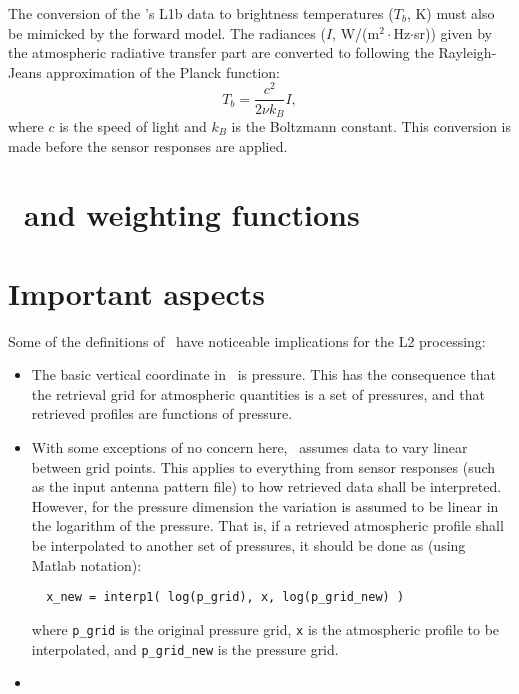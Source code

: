 The conversion of the \smr's L1b data to brightness temperatures ($T_b$, K)
must also be mimicked by the forward model. The radiances ($I$,
W/(m$^2\cdot$Hz$\cdot$sr)) given by the atmospheric radiative transfer part are
converted to following the Rayleigh-Jeans approximation of the Planck function:
\begin{equation}
  \label{eq:i2tb}
  T_b = \frac{c^2}{2\nu k_B} I,
\end{equation}
where $c$ is the speed of light and $k_B$ is the Boltzmann constant. This
conversion is made before the sensor responses are applied.



\section{\ARTS\ and weighting functions}
\label{sec:arts:wfuns}
%



\section{Important aspects}
\label{sec:arts:aspects}
%
Some of the definitions of \ARTS\ have noticeable implications for the
L2 processing:
\begin{itemize}
\item The basic vertical coordinate in \ARTS\ is pressure. This has the
  consequence that the retrieval grid for atmospheric quantities is a set of
  pressures, and that retrieved profiles are functions of pressure.
\item With some exceptions of no concern here, \ARTS\ assumes data to vary
  linear between grid points. This applies to everything from sensor responses
  (such as the input antenna pattern file) to how retrieved data shall be
  interpreted. However, for the pressure dimension the variation is assumed to
  be linear in the logarithm of the pressure. That is, if a retrieved
  atmospheric profile shall be interpolated to another set of pressures, it
  should be done as (using Matlab notation):
\begin{verbatim}
  x_new = interp1( log(p_grid), x, log(p_grid_new) )
\end{verbatim}
where \verb|p_grid| is the original pressure grid, \verb|x| is the atmospheric
profile to be interpolated, and \verb|p_grid_new| is the pressure grid.
\item {}
\end{itemize}



